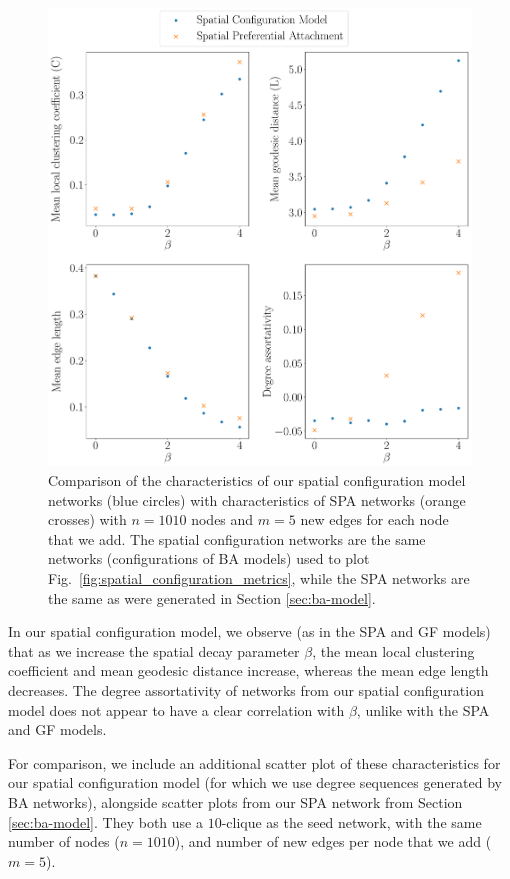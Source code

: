 \documentclass[%
 reprint,
 amsmath,amssymb,
 aps,
]{revtex4-1}
\begin{document}
\begin{figure}
    \centering
    \includegraphics[width=1.0\linewidth]{spatial_preferential_comparison.pdf}
    \caption{Comparison of the characteristics of our spatial configuration model networks (blue circles) with characteristics of SPA networks (orange crosses) with $n = 1010$ nodes and $m = 5$ new edges for each node that we add. {\color{red}The spatial configuration networks are the same networks (configurations of BA models) used to plot Fig.~\ref{fig:spatial_configuration_metrics}, while the SPA networks are the same as were generated in Section \ref{sec:ba-model}.}
}
    \label{fig:spatial_preferential_comparison}
\end{figure}
    

In our spatial configuration model, we observe (as in the {\color{red}SPA and GF} models) that as we increase the spatial decay parameter $\beta$, the mean local clustering coefficient and mean geodesic distance increase, whereas the mean edge length decreases. The degree assortativity of networks from our spatial configuration model does not appear to have a clear correlation with $\beta$, unlike with the {\color{red}SPA and GF models.}

For comparison, we include an additional scatter plot of these characteristics for our spatial configuration model (for which we use degree sequences generated by BA networks), {\color{red} alongside scatter plots from our SPA network from Section \ref{sec:ba-model}. They both use a $10$-clique as the seed network, with the same number of nodes ($n=1010$), and number of new edges per node that we add ($m=5$). }
\end{document}

